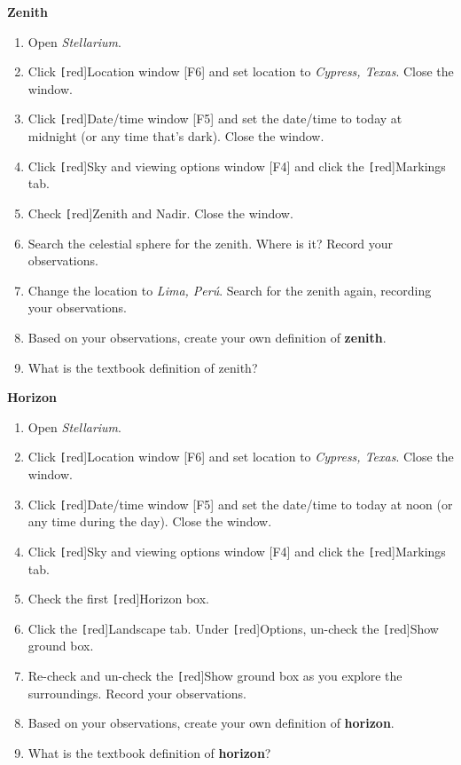 \documentclass{article}
\begin{document}
\begin{center} 
\end{center}

\textbf{Zenith}
\vspace{-1em}

\begin{enumerate}
\setlength\itemsep{0pt}
    \item Open \textit{Stellarium}.
    \item Click \texttt[red]{Location window [F6]} and set location to \textit{Cypress, Texas}. Close the window.
    \item Click \texttt[red]{Date/time window [F5]} and set the date/time to today at midnight (or any time that's dark). Close the window.
    \item Click \texttt[red]{Sky and viewing options window [F4]} and click the \texttt[red]{Markings} tab.
    \item Check \texttt[red]{Zenith and Nadir}. Close the window. \item Search the celestial sphere for the zenith. Where is it? Record your observations.
    \item Change the location to \textit{Lima, Per\'{u}}. Search for the zenith again, recording your observations.
    \item Based on your observations, create your own definition of \textbf{zenith}.
    \item What is the textbook definition of zenith?
\end{enumerate}

\textbf{Horizon}
\vspace{-1em}

\begin{enumerate}
\setlength\itemsep{0pt}
    \item Open \textit{Stellarium}.
    \item Click \texttt[red]{Location window [F6]} and set location to \textit{Cypress, Texas}. Close the window.
    \item Click \texttt[red]{Date/time window [F5]} and set the date/time to today at noon (or any time during the day). Close the window.
    \item Click \texttt[red]{Sky and viewing options window [F4]} and click the \texttt[red]{Markings} tab. 
    \item Check the first \texttt[red]{Horizon} box.
    \item Click the \texttt[red]{Landscape} tab. Under \texttt[red]{Options}, un-check the \texttt[red]{Show ground} box. 
    \item Re-check and un-check the \texttt[red]{Show ground} box as you explore the surroundings. Record your observations. 
    \item Based on your observations, create your own definition of \textbf{horizon}.
    \item What is the textbook definition of \textbf{horizon}?
\end{enumerate}
\end{document}
